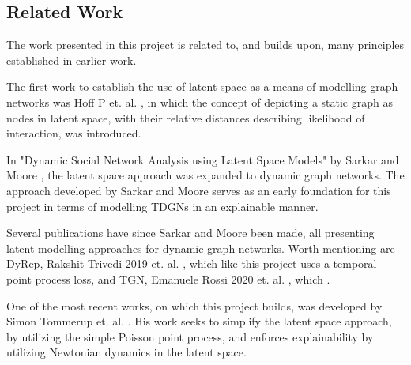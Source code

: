 \subsection{Related Work}
\label{sec:Intro:RelatedWork}
The work presented in this project is related to, and builds upon, many principles established in earlier work.

The first work to establish the use of latent space as a means of modelling graph networks was Hoff P et. al. \cite{Hoff2002LatentAnalysis}, in which the concept of depicting a static graph as nodes in latent space, with their relative distances describing likelihood of interaction, was introduced.

In "Dynamic Social Network Analysis using Latent Space Models" by Sarkar and Moore \cite{Sarkar2005DynamicModels}, the latent space approach was expanded to dynamic graph networks.
The approach developed by Sarkar and Moore serves as an early foundation for this project in terms of modelling TDGNs in an explainable manner.

Several publications have since Sarkar and Moore been made, all presenting latent modelling approaches for dynamic graph networks. 
Worth mentioning are DyRep, Rakshit Trivedi 2019 et. al. \cite{TrivediDYREP:GRAPHS}, which like this project uses a temporal point process loss, and TGN, Emanuele Rossi 2020 et. al. \cite{RossiTEMPORALGRAPHS}, which .
 
One of the most recent works, on which this project builds, was developed by Simon Tommerup et. al. \cite{Tommerup2021LearningNetworks}.
His work seeks to simplify the latent space approach, by utilizing the simple Poisson point process, and enforces explainability by utilizing Newtonian dynamics in the latent space.




